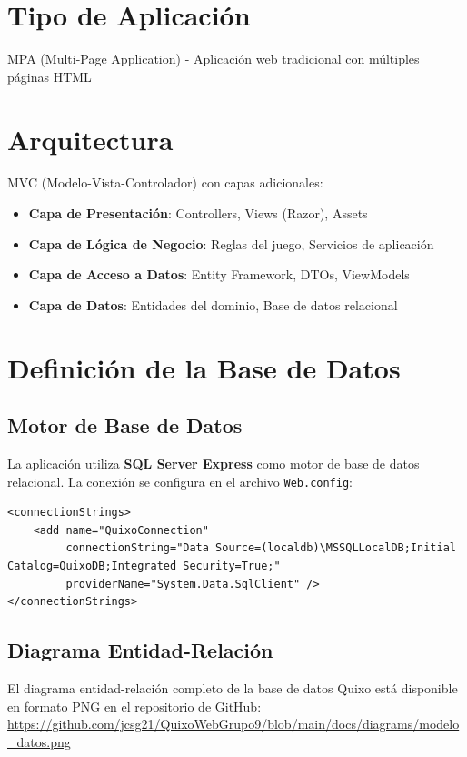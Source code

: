 \documentclass[12pt]{article}
\begin{document}
\section*{Tipo de Aplicación}
MPA (Multi-Page Application) - Aplicación web tradicional con múltiples páginas HTML

\section*{Arquitectura}
MVC (Modelo-Vista-Controlador) con capas adicionales:
\begin{itemize}
    \item \textbf{Capa de Presentación}: Controllers, Views (Razor), Assets
    \item \textbf{Capa de Lógica de Negocio}: Reglas del juego, Servicios de aplicación
    \item \textbf{Capa de Acceso a Datos}: Entity Framework, DTOs, ViewModels
    \item \textbf{Capa de Datos}: Entidades del dominio, Base de datos relacional
\end{itemize}

\section*{Definición de la Base de Datos}

\subsection*{Motor de Base de Datos}
La aplicación utiliza \textbf{SQL Server Express} como motor de base de datos relacional. La conexión se configura en el archivo \texttt{Web.config}:

\begin{lstlisting}[caption=Configuración de conexión en Web.config]
<connectionStrings>
    <add name="QuixoConnection"
         connectionString="Data Source=(localdb)\MSSQLLocalDB;Initial Catalog=QuixoDB;Integrated Security=True;"
         providerName="System.Data.SqlClient" />
</connectionStrings>
\end{lstlisting}

\subsection*{Diagrama Entidad-Relación}

El diagrama entidad-relación completo de la base de datos Quixo está disponible en formato PNG en el repositorio de GitHub: \url{https://github.com/jcsg21/QuixoWebGrupo9/blob/main/docs/diagrams/modelo_datos.png}
\end{document}
